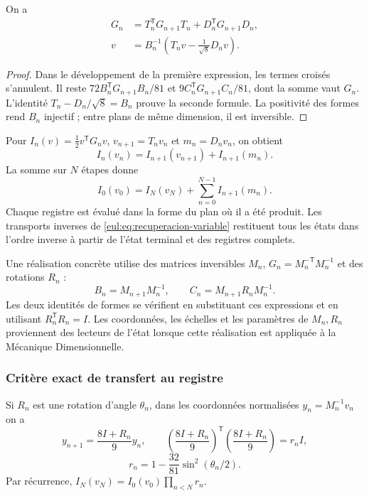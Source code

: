 \begin{teorema}
\label{eul:teo:forma-variable}
On a
\begin{align}
 G_n&=T_n^\mathsf TG_{n+1}T_n+D_n^\mathsf TG_{n+1}D_n,
 \label{eul:eq:balance-variable}\\
 v&=B_n^{-1}\left(T_nv-\frac1{\sqrt8}D_nv\right).
 \label{eul:eq:recuperacion-variable}
\end{align}
\end{teorema}
\begin{proof}
Dans le développement de la première expression, les termes croisés s'annulent. Il reste \(72B_n^\mathsf TG_{n+1}B_n/81\) et \(9C_n^\mathsf TG_{n+1}C_n/81\), dont la somme vaut \(G_n\). L'identité \(T_n-D_n/\sqrt8=B_n\) prouve la seconde formule. La positivité des formes rend \(B_n\) injectif ; entre plans de même dimension, il est inversible.
\end{proof}

Pour \(I_n(v)=\tfrac12v^\mathsf TG_nv\), \(v_{n+1}=T_nv_n\) et \(m_n=D_nv_n\), on obtient
\[
 I_n(v_n)=I_{n+1}(v_{n+1})+I_{n+1}(m_n).
\]
La somme sur \(N\) étapes donne
\begin{equation}
 I_0(v_0)=I_N(v_N)+\sum_{n=0}^{N-1}I_{n+1}(m_n).
\label{eul:eq:telescopica}
\end{equation}
Chaque registre est évalué dans la forme du plan où il a été produit. Les transports inverses de \eqref{eul:eq:recuperacion-variable} restituent tous les états dans l'ordre inverse à partir de l'état terminal et des registres complets.

Une réalisation concrète utilise des matrices inversibles \(M_n\), \(G_n=M_n^{-\mathsf T}M_n^{-1}\) et des rotations \(R_n\) :
\[
 B_n=M_{n+1}M_n^{-1},\qquad
 C_n=M_{n+1}R_nM_n^{-1}.
\]
Les deux identités de formes se vérifient en substituant ces expressions et en utilisant \(R_n^\mathsf TR_n=I\). Les coordonnées, les échelles et les paramètres de \(M_n,R_n\) proviennent des lecteurs de l'état lorsque cette réalisation est appliquée à la Mécanique Dimensionnelle.

\subsubsection{Critère exact de transfert au registre}

Si \(R_n\) est une rotation d'angle \(\theta_n\), dans les coordonnées normalisées \(y_n=M_n^{-1}v_n\) on a
\[
 y_{n+1}=\frac{8I+R_n}{9}y_n,
 \qquad
 \left(\frac{8I+R_n}{9}\right)^\mathsf T
 \left(\frac{8I+R_n}{9}\right)=r_nI,
\]
\[
 r_n=1-\frac{32}{81}\sin^2(\theta_n/2).
\]
Par récurrence, \(I_N(v_N)=I_0(v_0)\prod_{n<N}r_n\).

